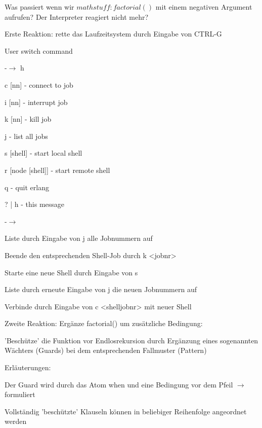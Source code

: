 \documentclass[10pt]{article}
\begin{document}
Was passiert wenn wir $mathstuff:factorial()$ mit einem negativen Argument aufrufen? Der Interpreter reagiert nicht mehr?
\begin{itemize*}
  \item Erste Reaktion: rette das Laufzeitsystem durch Eingabe von CTRL-G
  \begin{itemize*}
    \item User switch command
    \begin{enumerate*}
      \item -$\rightarrow$ h
      \item  c [nn] - connect to job
      \item i [nn] - interrupt job
      \item k [nn] - kill job
      \item j - list all jobs
      \item s [shell] - start local shell
      \item r [node [shell]] - start remote shell
      \item q - quit erlang
      \item ? | h - this message
      \item -$\rightarrow$
    \end{enumerate*}
    \item Liste durch Eingabe von j alle Jobnummern auf
    \item Beende den entsprechenden Shell-Job durch k <jobnr>
    \item Starte eine neue Shell durch Eingabe von s
    \item Liste durch erneute Eingabe von j die neuen Jobnummern auf
    \item Verbinde durch Eingabe von c <shelljobnr> mit neuer Shell
  \end{itemize*}
  \item Zweite Reaktion: Ergänze factorial() um zusätzliche Bedingung:
  \begin{itemize*}
    \item 'Beschütze' die Funktion vor Endlosrekursion durch Ergänzung eines sogenannten Wächters (Guards) bei dem entsprechenden Fallmuster  (Pattern)
    \item Erläuterungen:
    \begin{itemize*}
      \item Der Guard wird durch das Atom when und eine Bedingung vor dem Pfeil $\rightarrow$ formuliert
      \item Vollständig 'beschützte' Klauseln können in beliebiger Reihenfolge angeordnet werden

\end{itemize*}
\end{itemize*}
\end{itemize*}
\end{document}
